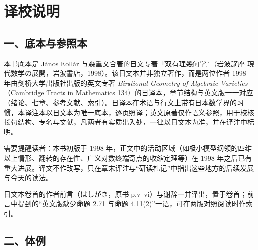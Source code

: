 \chapter*{译校说明}

\section*{一、底本与参照本}

本书底本是 János Kollár 与森重文合著的日文专著『双有理幾何学』（岩波講座 現代数学の展開，岩波書店，1998）。该日文本并非独立著作，而是两位作者 1998 年由剑桥大学出版社出版的英文专著 \emph{Birational Geometry of Algebraic Varieties}（Cambridge Tracts in Mathematics 134）的日译本，章节结构与英文版一一对应（绪论、七章、参考文献、索引）。日译本在术语与行文上带有日本数学界的习惯，本译注本以日文本为唯一底本，逐页照译；英文原著仅作语义参照，用于校核长句结构、专名与文献，凡两者有实质出入处，一律以日文本为准，并在译注中标明。

需要提醒读者：本书初版于 1998 年，正文中的活动区域（如极小模型纲领的四维以上情形、翻转的存在性、广义对数终端奇点的收缩定理等）在 1998 年之后已有重大进展。译文不作改写，只在章末评注与“研读札记”中指出这些地方的后续发展与今天的读法。

日文本卷首的作者前言（はしがき，原书 p.v–vi）与谢辞一并译出，置于卷首；前言中提到的“英文版缺少命题 2.71 与命题 4.11(2)”一语，可在两版对照阅读时作索引。

\section*{二、体例}

